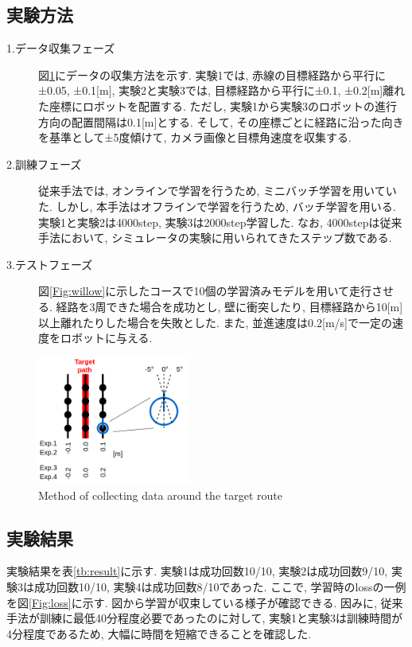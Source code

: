 \documentclass{ujarticle}
\begin{document}
\subsection{実験方法}
\begin{description}
		\item[1.データ収集フェーズ]図\ref{Fig:collect-data}にデータの収集方法を示す. 実験1では, 赤線の目標経路から平行に±0.05, ±0.1[m], 実験2と実験3では, 目標経路から平行に±0.1, ±0.2[m]離れた座標にロボットを配置する. ただし, 実験1から実験3のロボットの進行方向の配置間隔は0.1[m]とする. そして, その座標ごとに経路に沿った向きを基準として±5度傾けて, カメラ画像と目標角速度を収集する. 
		\item[2.訓練フェーズ]従来手法では, オンラインで学習を行うため, ミニバッチ学習を用いていた. しかし, 本手法はオフラインで学習を行うため, バッチ学習を用いる. 実験1と実験2は4000step, 実験3は2000step学習した. なお, 4000stepは従来手法において, シミュレータの実験に用いられてきたステップ数である. 
		\item[3.テストフェーズ]図\ref{Fig:willow}に示したコースで10個の学習済みモデルを用いて走行させる. 経路を3周できた場合を成功とし, 壁に衝突したり, 目標経路から10[m]以上離れたりした場合を失敗とした. また, 並進速度は0.2[m/s]で一定の速度をロボットに与える. 
\end{description}

\begin{figure}[t]
		\centering
		\includegraphics[width=0.45\textwidth]{img/collect2.png}
		\caption{Method of collecting data around the target route}
		\label{Fig:collect-data}
\end{figure}

\subsection{実験結果}実験結果を表\ref{tb:result}に示す. 実験1は成功回数10/10, 実験2は成功回数9/10, 実験3は成功回数10/10, 実験4は成功回数8/10であった. ここで, 学習時のlossの一例を図\ref{Fig:loss}に示す. 図から学習が収束している様子が確認できる. 因みに, 従来手法が訓練に最低40分程度必要であったのに対して, 実験1と実験3は訓練時間が4分程度であるため, 大幅に時間を短縮できることを確認した. 
\end{document}
